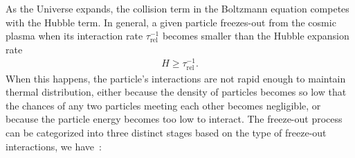 As the Universe expands, the collision term in the Boltzmann equation competes with the Hubble term. In general, a given particle freezes-out from the cosmic plasma when its interaction rate $\tau_\mathrm{rel}^{-1}$ becomes smaller than the Hubble expansion rate
\begin{align}
H\geqslant\tau_\mathrm{rel}^{-1}.
\end{align}
When this happens, the particle's interactions are not rapid enough to maintain thermal distribution, either because the density of particles becomes so low that the chances of any two particles meeting each other becomes negligible, or because the particle energy becomes too low to interact. The freeze-out process can be categorized into three distinct stages based on the type of freeze-out interactions, we have~\cite{Birrell:2012gg,Rafelski:2023emw}:
